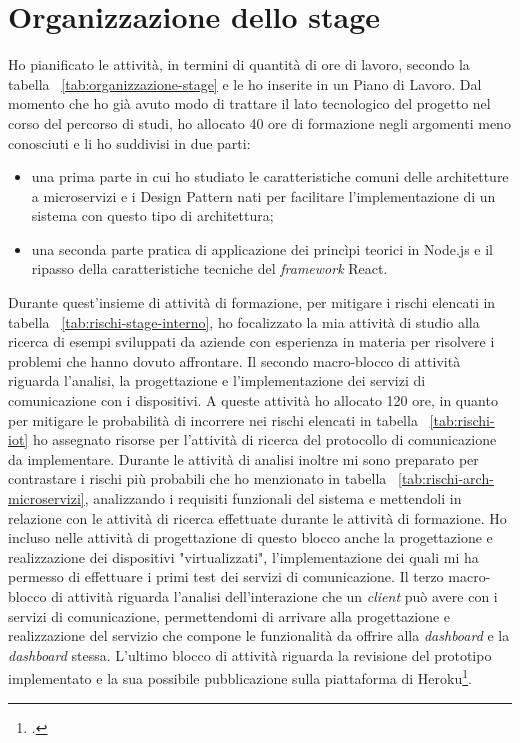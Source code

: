 \section{Organizzazione dello stage}

Ho pianificato le attività, in termini di quantità di ore di lavoro, secondo la tabella ~\ref{tab:organizzazione-stage} e le ho inserite in un Piano di Lavoro.
Dal momento che ho già avuto modo di trattare il lato tecnologico del progetto nel corso del percorso di studi, ho allocato 40 ore di formazione negli argomenti meno conosciuti e li ho suddivisi in due parti:
\begin{itemize}
  \item una prima parte in cui ho studiato le caratteristiche comuni delle architetture a microservizi e i Design Pattern nati per facilitare l'implementazione di un sistema con questo tipo di architettura;
  \item una seconda parte pratica di applicazione dei princìpi teorici in Node.js e il ripasso della caratteristiche tecniche del \emph{framework} React.
\end{itemize}
Durante quest'insieme di attività di formazione, per mitigare i rischi elencati in tabella ~\ref{tab:rischi-stage-interno}, ho focalizzato la mia attività di studio alla ricerca di esempi sviluppati da aziende con esperienza in materia per risolvere i problemi che hanno dovuto affrontare.
Il secondo macro-blocco di attività riguarda l'analisi, la progettazione e l'implementazione dei servizi di comunicazione con i dispositivi. A queste attività ho allocato 120 ore, in quanto per mitigare le probabilità di incorrere nei rischi elencati in tabella ~\ref{tab:rischi-iot} ho assegnato risorse per l'attività di ricerca del protocollo di comunicazione da implementare. Durante le attività di analisi inoltre mi sono preparato per contrastare i rischi più probabili che ho menzionato in tabella ~\ref{tab:rischi-arch-microservizi}, analizzando i requisiti funzionali del sistema e mettendoli in relazione con le attività di ricerca effettuate durante le attività di formazione. Ho incluso nelle attività di progettazione di questo blocco anche la progettazione e realizzazione dei dispositivi "virtualizzati", l'implementazione dei quali mi ha permesso di effettuare i primi test dei servizi di comunicazione.
Il terzo macro-blocco di attività riguarda l'analisi dell'interazione che un \emph{client} può avere con i servizi di comunicazione, permettendomi di arrivare alla progettazione e realizzazione del servizio che compone le funzionalità da offrire alla \emph{dashboard} e la \emph{dashboard} stessa.
L'ultimo blocco di attività riguarda la revisione del prototipo implementato e la sua possibile pubblicazione sulla piattaforma di Heroku\footcite{heroku}.

